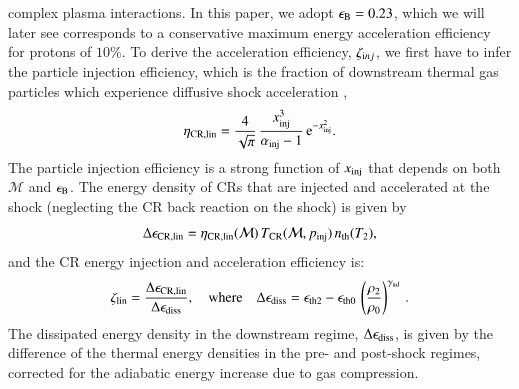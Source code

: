 \documentclass[a4paper,fleqn,usenatbib]{mnras}
\newcommand\eb{\epsilon_\rmn{B}}
\begin{document}
{complex plasma interactions. In this paper, we adopt $\eb = 0.23$,
which we will later see corresponds to a conservative maximum energy
acceleration efficiency for protons of $10\%$. To derive the
acceleration efficiency, $\zeta_{{\mathrm{i}}nj}$, we first have to infer the
particle injection efficiency, which is the fraction of downstream
thermal gas particles which experience diffusive shock acceleration
\citep[for details see ][]{pinzke13},
\begin{equation}
  \label{eq:eta}
  \eta_{\mathrm{CR,lin}} =
  \frac{4}{\sqrt{\pi}}\,\frac{x_{\mathrm{inj}}^3}{\alpha_{\mathrm{inj}}-1}\,
  {\mathrm{e}}^{-x_{\mathrm{inj}}^2}.
\end{equation}
The particle injection efficiency is a strong function of
$x_{\mathrm{inj}}$ that depends on both $\mathcal{M}$ and $\eb$. The
energy density of CRs that are injected and accelerated at the shock
(neglecting the CR back reaction on the shock) is given by
\begin{equation}
\label{eq:CR_energy} 
  \Delta\epsilon_{\mathrm{CR,lin}} =
  \eta_{\mathrm{CR,lin}}(\mathcal{M})\,T_{\mathrm{CR}}(\mathcal{M},p_{\mathrm{inj}})\,n_{\mathrm{th}}(T_2),
\end{equation}
and the CR energy injection and acceleration efficiency is:
\begin{equation}
  \zeta_{\mathrm{lin}} =
  \frac{\Delta\epsilon_{\mathrm{CR,lin}}}{\Delta\epsilon_{\mathrm{diss}}},
   \quad\mbox{where}\quad
  \Delta\epsilon_{\mathrm{diss}} = \epsilon_{\mathrm{th2}} - \epsilon_{\mathrm{th0}}\,\left(\frac{\rho_2}{\rho_0}\right)^{\gamma_{\mathrm{ad}}}\,.
\label{eqn:energy_frac}  
\end{equation}
The dissipated energy density in the downstream regime,
$\Delta\epsilon_{\mathrm{diss}}$, is given by the difference of the thermal
energy densities in the pre- and post-shock regimes, corrected for the
adiabatic energy increase due to gas compression.}
\end{document}
